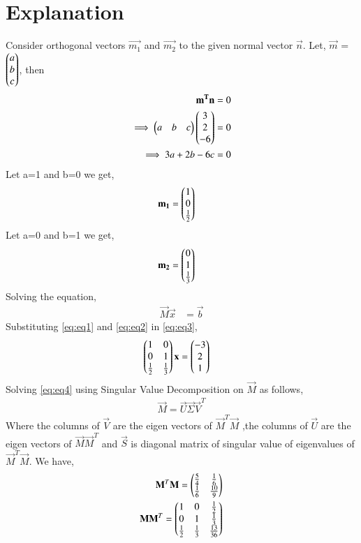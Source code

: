 \documentclass[journal,12pt,twocolumn]{IEEEtran}
\begin{document}
\section{Explanation}
Consider orthogonal vectors $\vec{m_1}$ and $\vec{m_2}$ to the given normal vector $\vec{n}$. Let, $\vec{m}$ = $\begin{pmatrix}a\\b\\c\end{pmatrix}$, then
\begin{align}
\mathbf{m^T}\mathbf{n} &= 0\\
\implies\begin{pmatrix}a&b&c\end{pmatrix}\begin{pmatrix}3\\2\\-6\end{pmatrix} &= 0\\
\implies3a+2b-6c &= 0
\end{align}
Let a=1 and b=0 we get,
\begin{align}
\mathbf{m_1} &= \begin{pmatrix}1\\0\\\frac{1}{2}\end{pmatrix} \label{eq:eq1}
\end{align}
Let a=0 and b=1 we get,
\begin{align}
\mathbf{m_2} &= \begin{pmatrix}0\\1\\\frac{1}{3}\end{pmatrix} \label{eq:eq2}
\end{align}
Solving the equation,
\begin{align}
\vec{M}\vec{x} &= \vec{b}\label{eq:eq3}
\end{align}
Substituting \eqref{eq:eq1} and \eqref{eq:eq2} in \eqref{eq:eq3},
\begin{align}
    \begin{pmatrix}1&0\\0&1\\\frac{1}{2}&\frac{1}{3}\end{pmatrix}\mathbf{x} &= \begin{pmatrix}-3\\2\\1\end{pmatrix}\label{eq:eq4}
\end{align}
Solving \eqref{eq:eq4} using Singular Value Decomposition on $\vec{M}$ as follows,
\begin{align}
\vec{M}=\vec{U}\vec{\Sigma}\vec{V}^T\label{eq:eq5}
\end{align}
Where the columns of $\vec{V}$ are the eigen vectors of $\vec{M}^T\vec{M}$ ,the columns of $\vec{U}$ are the eigen vectors of $\vec{M}\vec{M}^T$ and $\vec{S}$ is diagonal matrix of singular value of eigenvalues of $\vec{M}^T\vec{M}$. We have,
\begin{align}
\mathbf{M}^T\mathbf{M}=\begin{pmatrix}\frac{5}{4}&\frac{1}{6}\\\frac{1}{6}&\frac{10}{9}\end{pmatrix}\label{eq:eq6}\\
\mathbf{M}\mathbf{M}^T=\begin{pmatrix}1&0&\frac{1}{2}\\0&1&\frac{1}{3}\\\frac{1}{2}&\frac{1}{3}&\frac{13}{36}\end{pmatrix}
\end{align}
\end{document}
